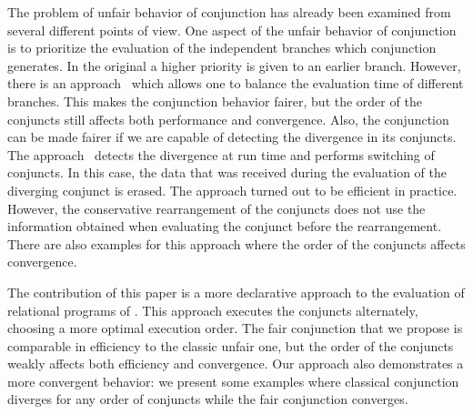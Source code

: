 The problem of unfair behavior of conjunction has already been examined from several different points of view. One aspect of the unfair behavior of conjunction is to prioritize the
evaluation of the independent branches which conjunction generates. In the original \mk a higher priority is given to an earlier branch. However, there is an approach~\cite{fair:towardsAM}
which allows one to balance the evaluation time of different branches. This makes the conjunction behavior fairer, but the order of the conjuncts still affects both performance and convergence.
Also, the conjunction can be made fairer if we are capable of detecting the divergence in its conjuncts. The approach~\cite{fair:DivTest} detects the divergence at run time and
performs switching of conjuncts. In this case, the data that was received during the evaluation of the diverging conjunct is erased. The approach turned out to be efficient in practice.
However, the conservative rearrangement of the conjuncts does not use the information obtained when evaluating the conjunct before the rearrangement. There are also examples for
this approach where the order of the conjuncts affects convergence.

The contribution of this paper is a more declarative approach to the evaluation of relational programs of \mk. This approach executes the conjuncts alternately, choosing a more optimal execution order.
The fair conjunction that we propose is comparable in efficiency to the classic unfair one, but the order of the conjuncts weakly affects both efficiency and convergence. Our approach also 
demonstrates a more convergent behavior: we present some examples where classical conjunction diverges for any order of conjuncts while the fair conjunction converges.

